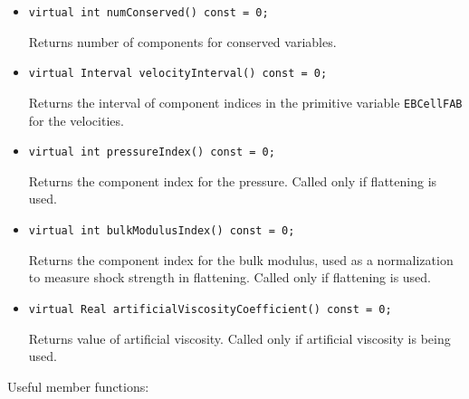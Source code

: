 \begin{itemize}
\item \begin{small}\begin{verbatim}
virtual int numConserved() const = 0;
\end{verbatim}\end{small}
Returns number of components for conserved variables.

\item \begin{small}\begin{verbatim}
virtual Interval velocityInterval() const = 0;
\end{verbatim}\end{small}
Returns the interval of component indices in the primitive variable 
{\tt EBCellFAB} for the velocities.

\item \begin{small}\begin{verbatim}
virtual int pressureIndex() const = 0;
\end{verbatim}\end{small}
Returns the component index for the pressure. Called only if flattening
is used.

\item \begin{small}\begin{verbatim}
virtual int bulkModulusIndex() const = 0;
\end{verbatim}\end{small}
Returns the component index for the bulk modulus, used as a
normalization to measure shock strength in flattening. 
Called only if flattening is used.

\item \begin{small}\begin{verbatim}
virtual Real artificialViscosityCoefficient() const = 0;
\end{verbatim}\end{small}
Returns value of artificial viscosity. Called only if artificial
viscosity is being used.

\end{itemize}

\noindent
Useful member functions:

